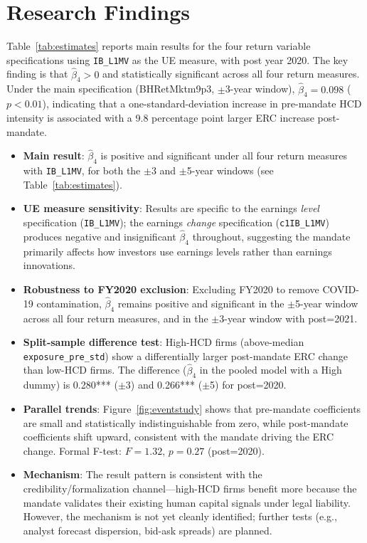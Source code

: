 \documentclass[12pt,english]{article}
\begin{document}
\section{Research Findings}\label{sec:results}

Table~\ref{tab:estimates} reports main results for the four return variable
specifications using \texttt{IB\_L1MV} as the UE measure, with post year
2020. The key finding is that $\hat{\beta}_4 > 0$ and statistically
significant across all four return measures. Under the main specification
(BHRetMktm9p3, $\pm$3-year window), $\hat{\beta}_4 = 0.098$ ($p < 0.01$),
indicating that a one-standard-deviation increase in pre-mandate HCD intensity
is associated with a 9.8 percentage point larger ERC increase post-mandate.

\begin{itemize}
    \item \textbf{Main result}: $\hat{\beta}_4$ is positive and significant
          under all four return measures with \texttt{IB\_L1MV}, for both the
          $\pm$3 and $\pm$5-year windows (see Table~\ref{tab:estimates}).
    \item \textbf{UE measure sensitivity}: Results are specific to the
          earnings \emph{level} specification (\texttt{IB\_L1MV}); the
          earnings \emph{change} specification (\texttt{c1IB\_L1MV}) produces
          negative and insignificant $\hat{\beta}_4$ throughout, suggesting
          the mandate primarily affects how investors use earnings levels
          rather than earnings innovations.
    \item \textbf{Robustness to FY2020 exclusion}: Excluding FY2020 to
          remove COVID-19 contamination, $\hat{\beta}_4$ remains positive
          and significant in the $\pm$5-year window across all four return
          measures, and in the $\pm$3-year window with post=2021.
    \item \textbf{Split-sample difference test}: High-HCD firms (above-median
          \texttt{exposure\_pre\_std}) show a differentially larger
          post-mandate ERC change than low-HCD firms. The difference
          ($\hat{\beta}_4$ in the pooled model with a High dummy) is
          0.280*** ($\pm$3) and 0.266*** ($\pm$5) for post=2020.
    \item \textbf{Parallel trends}: Figure~\ref{fig:eventstudy} shows that
          pre-mandate coefficients are small and statistically
          indistinguishable from zero, while post-mandate coefficients shift
          upward, consistent with the mandate driving the ERC change.
          Formal F-test: $F = 1.32$, $p = 0.27$ (post=2020).
    \item \textbf{Mechanism}: The result pattern is consistent with the
          credibility/formalization channel---high-HCD firms benefit more
          because the mandate validates their existing human capital signals
          under legal liability. However, the mechanism is not yet cleanly
          identified; further tests (e.g., analyst forecast dispersion, bid-ask
          spreads) are planned.
\end{itemize}
\end{document}
